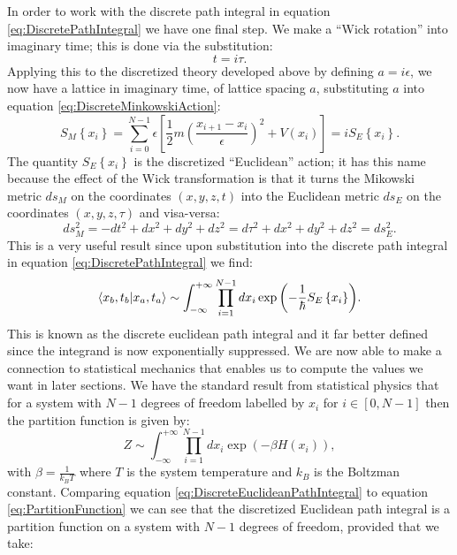 \documentclass[12pt]{article}
\begin{document}
In order to work with the discrete path integral in equation \ref{eq:DiscretePathIntegral} we have one final step. We make a ``Wick rotation'' into imaginary time; this is done via the substitution:
\begin{equation}
	\label{eq:WickRotation}
	t = i\tau.
\end{equation}
Applying this to the discretized theory developed above by defining $a=i\epsilon$, we now have a lattice in imaginary time, of lattice spacing $a$, substituting $a$ into equation \ref{eq:DiscreteMinkowskiAction}:
\begin{equation}
	\label{eq:DiscreteEuclideanAction}
	S_M\left\{x_i\right\} = \sum_{i=0}^{N-1} \epsilon \left[\frac{1}{2}m\left(\frac{x_{i+1}-x_{i}}{\epsilon}\right)^2 + V(x_i)\right] = iS_E\left\{x_i\right\}.
\end{equation}
The quantity $S_{E}\left\{x_i\right\}$ is the discretized ``Euclidean'' action; it has this name because the effect of the Wick transformation is that it turns the Mikowski metric $ds_{M}$ on the coordinates $\left(x,y,z,t\right)$ into the Euclidean metric $ds_{E}$ on the coordinates $\left(x,y,z,\tau\right)$ and visa-versa:
\begin{equation}
	\label{eq:MetricTransform}
	 ds_{M}^{2}= -dt^2 + dx^2 + dy^2 + dz^2 = d\tau^2 + dx^2 + dy^2 + dz^2 = ds_{E}^{2}.
\end{equation}
This is a very useful result since upon substitution into the discrete path integral in equation \ref{eq:DiscretePathIntegral} we find:
\begin{equation}
	\label{eq:DiscreteEuclideanPathIntegral}
	\braket{x_b,t_b|x_a,t_a} \sim \int^{+\infty}_{-\infty}\prod_{i=1}^{N-1}dx_i \exp{\left(-\frac{1}{\hbar}S_{E}\left\{x_i\right\}\right)}.
\end{equation}
This is known as the discrete euclidean path integral and it far better defined since the integrand is now exponentially suppressed. We are now able to make a connection to statistical mechanics that enables us to compute the values we want in later sections. We have the standard result from statistical physics that for a system with $N-1$ degrees of freedom labelled by $x_i$ for $i \in \left[0,N-1\right]$ then the partition function is given by:
\begin{equation}
	\label{eq:PartitionFunction}
	Z \sim \int_{-\infty}^{+\infty}\prod_{i=1}^{N-1}dx_{i}\exp{\left(-\beta H\left({x_i}\right)\right)},
\end{equation}
with $\beta=\frac{1}{k_{B}T}$ where $T$ is the system temperature and $k_{B}$ is the Boltzman constant. Comparing equation \ref{eq:DiscreteEuclideanPathIntegral} to equation \ref{eq:PartitionFunction} we can see that the discretized Euclidean path integral is a partition function on a system with $N-1$ degrees of freedom, provided that we take:
\end{document}
